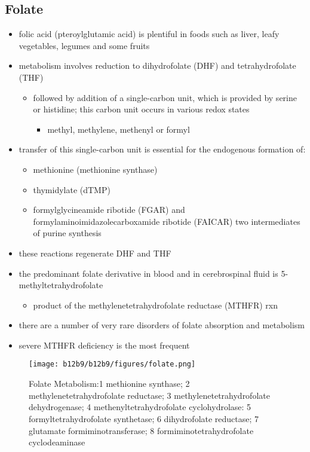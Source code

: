 \documentclass{scrartcl}
\begin{document}
\subsection{Folate}
\label{sec:org6fbcb98}
\begin{itemize}
\item folic acid (pteroylglutamic acid) is plentiful in foods such as
liver, leafy vegetables, legumes and some fruits
\item metabolism involves reduction to dihydrofolate (DHF) and
tetrahydrofolate (THF)
\begin{itemize}
\item followed by addition of a single-carbon unit, which is provided by
serine or histidine; this carbon unit occurs in various redox
states
\begin{itemize}
\item methyl, methylene, methenyl or formyl
\end{itemize}
\end{itemize}
\item transfer of this single-carbon unit is essential for the endogenous
formation of:
\begin{itemize}
\item methionine (methionine synthase)
\item thymidylate (dTMP)
\item formylglycineamide ribotide (FGAR) and
formylaminoimidazolecarboxamide ribotide (FAICAR) two
intermediates of purine synthesis
\end{itemize}
\item these reactions regenerate DHF and THF
\item the predominant folate derivative in blood and in cerebrospinal
fluid is 5-methyltetrahydrofolate
\begin{itemize}
\item product of the methylenetetrahydrofolate reductase (MTHFR) rxn
\end{itemize}
\item there are a number of very rare disorders of folate absorption and metabolism
\item severe MTHFR deficiency is the most frequent
\end{itemize}

\begin{figure}[htbp]
\centering
\texttt{[image: b12b9/b12b9/figures/folate.png]}
\caption{\label{fig:orgc5b3398}Folate Metabolism:1 methionine synthase; 2 methylenetetrahydrofolate reductase; 3 methylenetetrahydrofolate dehydrogenase; 4 methenyltetrahydrofolate cyclohydrolase: 5 formyltetrahydrofolate synthetase; 6 dihydrofolate reductase; 7 glutamate formiminotransferase; 8 formiminotetrahydrofolate cyclodeaminase}
\end{figure}
\end{document}
